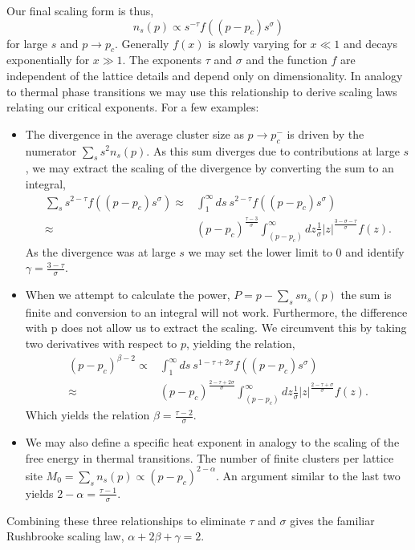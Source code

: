 Our final scaling form is thus,
\[n_s(p) \propto s^{-\tau} f((p-p_c)s^\sigma) \]
for large $s$ and $p\to p_c$.  Generally $f(x)$ is slowly varying
for $x \ll 1$ and decays exponentially for $x \gg 1$.  The exponents $\tau$
and $\sigma$ and the function $f$ are independent of the lattice details
and depend only on dimensionality.  In analogy to thermal phase transitions
we may use this relationship to derive scaling laws relating our critical
exponents. For a few examples:
\begin{itemize}
\item The divergence in the average cluster size as $p\to p_c^-$ is driven
by the numerator $\sum_s s^2 n_s(p).$ As this sum diverges due to contributions
at large $s$, we may extract the scaling of the divergence by converting the sum
to an integral,
\begin{align*}
\sum_s s^{2-\tau}f((p-p_c)s^\sigma) \approx& \int^\infty_1 ds\: 
                                          s^{2-\tau}f((p-p_c)s^\sigma) \\
\approx& (p-p_c)^\frac{\tau-3}{\sigma} \int_{(p-p_c)}^\infty
                                    dz \frac{1}{\sigma} |z|^\frac{3-\sigma-\tau}
                                                         {\sigma} f(z).
\end{align*}
As the divergence was at large $s$ we may set the lower limit to 0
and identify \(\gamma = \frac{3-\tau}{\sigma}\).

\item When we attempt to calculate the power, $P = p - \sum_s s n_s(p)$ the
sum is finite and conversion to an integral will not work.  Furthermore, the
difference with p does not allow us to extract the scaling.  We circumvent
this by taking two derivatives with respect to $p$, yielding the relation,
\begin{align*}
(p-p_c)^{\beta-2} \propto& \int^\infty_1 ds\: 
                                          s^{1-\tau + 2\sigma}f((p-p_c)s^\sigma) \\
\approx& (p-p_c)^\frac{2-\tau+2\sigma}{\sigma} \int_{(p-p_c)}^\infty
                                    dz \frac{1}{\sigma} |z|^\frac{2-\tau+\sigma}
                                                         {\sigma} f(z).
\end{align*}
Which yields the relation $\beta = \frac{\tau-2}{\sigma}$.

\item We may also define a specific heat exponent in analogy to the scaling
of the free energy in thermal transitions.  The number of finite clusters
per lattice site $M_0 = \sum_s n_s(p) \propto (p-p_c)^{2-\alpha}$.  An
argument similar to the last two yields $2-\alpha = \frac{\tau -1}{\sigma}$.
\end{itemize}
Combining these three relationships to eliminate $\tau$ and $\sigma$ gives
the familiar Rushbrooke scaling law, $\alpha + 2\beta + \gamma = 2$.

